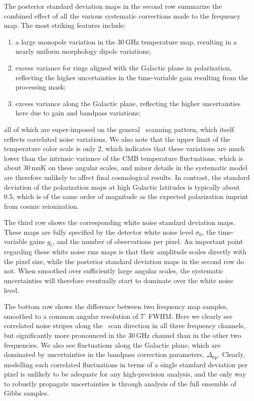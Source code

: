 \documentclass[onecolumn]{aa}
\begin{document}
The posterior standard deviation maps in the second row summarize the
combined effect of all the various systematic corrections made to the
frequency map. The most striking features include:
\begin{enumerate}
  \item a large monopole variation in the 30\,GHz temperature map,
    resulting in a nearly uniform morphology dipole variations;
  \item excess variance for rings aligned with the Galactic plane in
    polarization, reflecting the higher uncertainties in the
    time-variable gain resulting from the processing mask;
  \item excess variance along the Galactic plane, reflecting the
    higher uncertainties here due to gain and bandpass variations;
\end{enumerate}
all of which are super-imposed on the general \Planck\ scanning
pattern, which itself reflects correlated noise variations. We also
note that the upper limit of the temperature color scale is only
2\muK, which indicates that these variations are much lower than the
intrinsic variance of the CMB temperature fluctuations, which is about
30\,muK on these angular scales, and minor details in the systematic
model are therefore unlikely to affect final cosmological results. In
contrast, the standard deviation of the polarization maps at high
Galactic latitudes is typically about 0.5\muK, which is of the same
order of magnitude as the expected polarization imprint from cosmic
reionization. 



The third row shows the corresponding white noise standard deviation
maps. These maps are fully specified by the detector white noise level
$\sigma_0$, the time-variable gains $g_t$, and the number of
observations per pixel. An important point regarding these white noise
rms maps is that their amplitude scales directly with the pixel size,
while the posterior standard deviation maps in the second row do
not. When smoothed over sufficiently large angular scales, the
systematic uncertainties will therefore eventually start to dominate
over the white noise level. 

The bottom row shows the difference between two frequency map samples,
smoothed to a common angular resolution of $7^{\circ}$ FWHM. Here we
clearly see correlated noise stripes along the \Planck\ scan direction
in all three frequency channels, but significantly more pronounced in
the 30\,GHz channel than in the other two frequencies. We also see
fluctuations along the Galactic plane, which are dominated by
uncertainties in the bandpass correction parameters,
$\Delta_{\mathrm{bp}}$. Clearly, modelling such correlated
fluctuations in terms of a single standard deviation per pixel is
unlikely to be adequate for any high-precision analysis, and the only
way to robustly propagate uncertainties is through analysis of the
full ensemble of Gibbs samples.
\end{document}
